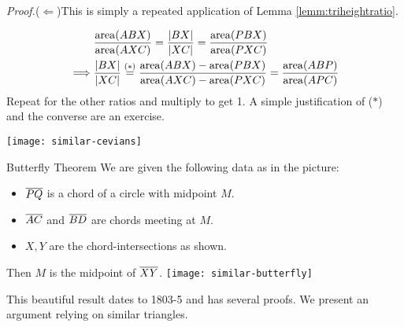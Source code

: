 \begin{tcolorbox}[proofstyle]
	\emph{Proof.}\lstsp($\Leftarrow$)\quad This is simply a repeated application of Lemma \ref{lemm:triheightratio}.\par
	\begin{minipage}[t]{0.65\linewidth}\vspace{-15pt}
		\begin{align*}
			&
			\frac{\operatorname{area}(ABX)}{\operatorname{area}(AXC)}=\frac{\left| BX\right|}{\left| XC\right|} =\frac{\operatorname{area}(PBX)}{\operatorname{area}(PXC)}
			\\
			\implies
			&
			\frac{\left| BX\right|}{\left| XC\right|} \overset{\text{($\ast$)}}{=}\frac{\operatorname{area}(ABX)-\operatorname{area}(PBX)}{\operatorname{area}(AXC)-\operatorname{area}(PXC)} =\frac{\operatorname{area}(ABP)}{\operatorname{area}(APC)}
		\end{align*}
		Repeat for the other ratios and multiply to get 1.\smallbreak
		A simple justification of ($\ast$) and the converse are an exercise.
	\end{minipage}
	\hfill
	\begin{minipage}[t]{0.34\linewidth}\vspace{-15pt} 
		\flushright
		\texttt{[image: similar-cevians]}\\[-5pt]
		\hfill\qedsymbol
	\end{minipage}
\end{tcolorbox}

\goodbreak


\begin{thm}[lower separated=false, sidebyside, sidebyside align=top seam, sidebyside gap=0pt, righthand width=0.3\linewidth]{Butterfly Theorem}{}
	We are given the following data as in the picture:
	\begin{itemize}
	  \item $\overline{PQ}$ is a chord of a circle with midpoint $M$.
	  \item $\overline{AC}$ and $\overline{BD}$ are chords meeting at $M$.
	  \item $X,Y$ are the chord-intersections as shown.
	\end{itemize}
	Then $M$ is the midpoint of $\overline{XY}$.
	\tcblower
	\flushright
	\texttt{[image: similar-butterfly]}
\end{thm}

This beautiful result dates to 1803-5 and has several proofs. We present an argument relying on similar triangles.


